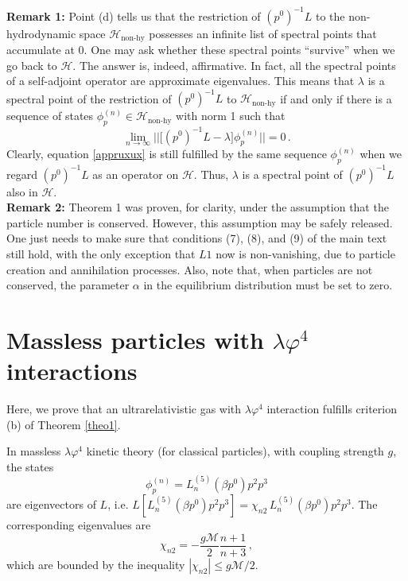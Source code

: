\documentclass[a4paper, amsfonts, amssymb, amsmath, reprint, showkeys, nofootinbib, twoside, onecolumn,notitlepage,,longbibliography]{revtex4-2}
\theoremstyle{definition}
\theoremstyle{theorem}
\theoremstyle{corollary}
\begin{document}
\textbf{Remark 1:} Point (d) tells us that the restriction of $(p^0)^{-1}L$ to the non-hydrodynamic space $\mathcal{H}_{\text{non-hy}}$ possesses an infinite list of spectral points that accumulate at $0$. One may ask whether these spectral points ``survive'' when we go back to $\mathcal{H}$. The answer is, indeed, affirmative. In fact, all the spectral points of a self-adjoint operator are approximate eigenvalues. This means that $\lambda$ is a spectral point of the restriction of $(p^0)^{-1}L$ to $\mathcal{H}_{\text{non-hy}}$ if and only if there is a sequence of states $\phi_p^{(n)}\in \mathcal{H}_{\text{non-hy}}$ with norm 1 such that
\begin{equation}\label{appruxux}
    \lim_{n\rightarrow \infty} ||\big[(p^0)^{-1}L-\lambda \big]\phi_p^{(n)} ||=0 \, .
\end{equation}
Clearly, equation \eqref{appruxux} is still fulfilled by the same sequence $\phi_p^{(n)}$ when we regard $(p^0)^{-1}L$ as an operator on $\mathcal{H}$. Thus, $\lambda$ is a spectral point of $(p^0)^{-1}L$ also in $\mathcal{H}$.\\

\textbf{Remark 2:} Theorem 1 was proven, for clarity, under the assumption that the particle number is conserved. However, this assumption may be safely released. One just needs to make sure that conditions (7), (8), and (9) of the main text still hold, with the only exception that $L1$ now is non-vanishing, due to particle creation and annihilation processes. Also, note that, when particles are not conserved, the parameter $\alpha$ in the equilibrium distribution must be set to zero.

\newpage


\section{Massless particles with $\lambda \varphi^4$ interactions}\label{Appubobb}

Here, we prove that an ultrarelativistic gas with $\lambda \varphi^4$ interaction fulfills criterion (b) of Theorem \ref{theo1}.

In massless $\lambda \varphi^4$ kinetic theory (for classical particles), with coupling strength $g$, the states 
\begin{equation}\label{phiF4f}
\phi_p^{(n)} =L^{(5)}_n(\beta p^0) p^2 p^3  
\end{equation}
are eigenvectors of $L$, i.e. $L[L^{(5)}_n(\beta p^0) p^2 p^3]=\chi_{n2} \, L^{(5)}_n(\beta p^0) p^2 p^3$. The corresponding eigenvalues are
\begin{equation}
    \chi_{n2}= -\dfrac{g\mathcal{M}}{2} \dfrac{n+1}{n+3} \, ,
\end{equation}
which are bounded by the inequality $|\chi_{n2}|\leq g\mathcal{M}/2$.
\end{document}
